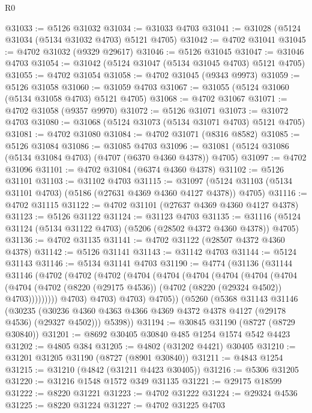 \begin{lexlean}{R0}
\begin{coremodule}
@31033 := @5126 @31032
@31034 := @31033 @4703
@31041 := @31028 (@5124 @31034 (@5134 @31032 @4703) @5121 @4705)
@31042 := @4702 @31041
@31045 := @4702 @31032 (@9329 @29617)
@31046 := @5126 @31045
@31047 := @31046 @4703
@31054 := @31042 (@5124 @31047 (@5134 @31045 @4703) @5121 @4705)
@31055 := @4702 @31054
@31058 := @4702 @31045 (@9343 @9973)
@31059 := @5126 @31058
@31060 := @31059 @4703
@31067 := @31055 (@5124 @31060 (@5134 @31058 @4703) @5121 @4705)
@31068 := @4702 @31067
@31071 := @4702 @31058 (@9357 @9970)
@31072 := @5126 @31071
@31073 := @31072 @4703
@31080 := @31068 (@5124 @31073 (@5134 @31071 @4703) @5121 @4705)
@31081 := @4702 @31080
@31084 := @4702 @31071 (@8316 @8582)
@31085 := @5126 @31084
@31086 := @31085 @4703
@31096 := @31081 (@5124 @31086 (@5134 @31084 @4703) (@4707 (@6370 @4360 @4378)) @4705)
@31097 := @4702 @31096
@31101 := @4702 @31084 (@6374 @4360 @4378)
@31102 := @5126 @31101
@31103 := @31102 @4703
@31115 := @31097 (@5124 @31103 (@5134 @31101 @4703) (@5186 (@27631 @4369 @4360 @4127 @4378)) @4705)
@31116 := @4702 @31115
@31122 := @4702 @31101 (@27637 @4369 @4360 @4127 @4378)
@31123 := @5126 @31122
@31124 := @31123 @4703
@31135 := @31116 (@5124 @31124 (@5134 @31122 @4703) (@5206 (@28502 @4372 @4360 @4378)) @4705)
@31136 := @4702 @31135
@31141 := @4702 @31122 (@28507 @4372 @4360 @4378)
@31142 := @5126 @31141
@31143 := @31142 @4703
@31144 := @5124 @31143
@31146 := @5134 @31141 @4703
@31190 := @4774
    (@31136
      (@31144
        @31146
        (@4702
          (@4702
            (@4702
              (@4704
                (@4704
                  (@4704
                    (@4704
                      (@4704
                        (@4704
                          (@4704
                            (@4702
                              (@8220 (@29175 @4536))
                              (@4702 (@8220 (@29324 @4502)) @4703)))))))))
              @4703)
            @4703)
          @4703)
        @4705))
    (@5260
      (@5368
        @31143
        @31146
        (@30235 (@30236 @4360 @4363 @4366 @4369 @4372 @4378 @4127 (@29178 @4536) (@29327 @4502)))
        @5398))
@31194 := @30845 @31190 (@8727 (@8729 @30840))
@31201 := @8692 @30405 @30840 @485 @1254 @1574 @542 @4423
@31202 := @4805 @384
@31205 := @4802 (@31202 @4421) @30405
@31210 := @31201 @31205 @31190 (@8727 (@8901 @30840))
@31211 := @4843 @1254
@31215 := @31210 (@4842 (@31211 @4423 @30405))
@31216 := @5306 @31205
@31220 := @31216 @1548 @1572 @349 @31135
@31221 := @29175 @18599
@31222 := @8220 @31221
@31223 := @4702 @31222
@31224 := @29324 @4536
@31225 := @8220 @31224
@31227 := @4702 @31225 @4703

\end{coremodule}
\end{lexlean}

